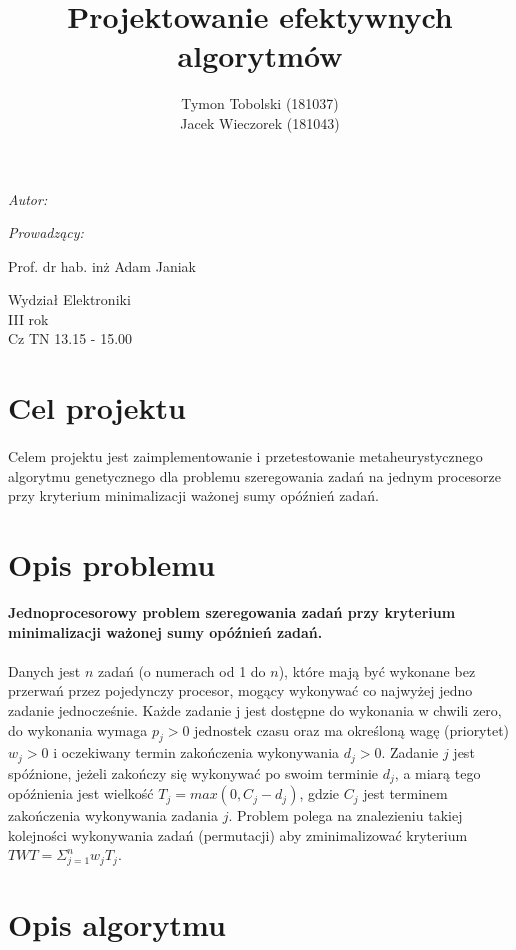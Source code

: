 \documentclass[wide,a4paper,titlepage,12pt] {article}
\title{Projektowanie efektywnych algorytmów}
\author{Tymon Tobolski (181037)\\ Jacek Wieczorek (181043)}
\makeatletter
\renewcommand{\maketitle}{
\begin{titlepage}
  \begin{center}
    \vspace*{3cm}
    \LARGE \@title \par
    \vspace{2cm}
    \textit{\small Autor:}\par
    \normalsize \@author\par \normalsize
    \vspace{3cm}
    \textit{\small Prowadzący:}\par
   Prof. dr hab. inż Adam Janiak \par
    \vspace{2cm}
    Wydział Elektroniki\\ III rok\\ Cz TN 13.15 - 15.00\par
    \vspace{4cm}
    \small \@date
  \end{center}
\end{titlepage}
}
\makeatother
\begin{document}
\maketitle

\section{Cel projektu}
\paragraph{}
  Celem projektu jest zaimplementowanie i przetestowanie metaheurystycznego algorytmu genetycznego dla problemu szeregowania zadań na jednym procesorze przy kryterium minimalizacji ważonej sumy opóźnień zadań.

\section{Opis problemu}
{\bf Jednoprocesorowy problem szeregowania zadań przy kryterium
minimalizacji ważonej sumy opóźnień zadań.}

\paragraph{}
Danych jest $n$ zadań (o numerach od 1 do $n$), które mają być wykonane bez przerwań przez pojedynczy procesor, mogący wykonywać co najwyżej jedno zadanie jednocześnie.
Każde zadanie j jest dostępne do wykonania w chwili zero, do wykonania wymaga $p_{j} > 0$ jednostek czasu oraz ma określoną wagę (priorytet) $w_{j} > 0$ i oczekiwany termin zakończenia
wykonywania $d_{j} > 0$. Zadanie $j$ jest spóźnione, jeżeli zakończy się wykonywać po swoim terminie $d_{j}$, a miarą tego opóźnienia jest wielkość $T_{j} = max(0, C_{j} - d_{j} )$, gdzie $C_{j}$ jest terminem zakończenia
wykonywania zadania $j$. Problem polega na znalezieniu takiej kolejności wykonywania zadań (permutacji) aby zminimalizować kryterium $TWT = \Sigma_{j=1}^{n} w_{j} T_{j}$.

\section{Opis algorytmu}
\end{document}
